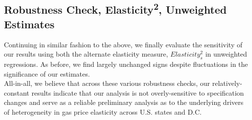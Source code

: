\begin{table}[H]
	\begin{center}
		
		\label{pop_share_estimates_y2_w}
		\caption[Alternate Cheaper Gas Border Predictor Estimates, Weighted]{Continuing as described in table \ref{main_estimates_y2_w}, we find largely similar results using our alternate elasticity measure.}
	\end{center}
\end{table}

\subsection{Robustness Check, Elasticity\textsuperscript{2}, Unweighted Estimates}
Continuing in similar fashion to the above, we finally evaluate the sensitivity of our results using both the alternate elasticity measure, $Elasticity^{2}_{s}$ in unweighted regressions. As before, we find largely unchanged signs despite fluctuations in the significance of our estimates. \\

All-in-all, we believe that across these various robustness checks, our relatively-constant results indicate that our analysis is not overly-sensitive to specification changes and serve as a reliable preliminary analysis as to the underlying drivers of heterogeneity in gas price elasticity across U.S. states and D.C. 

\begin{table}[H]
	\begin{center}
		
		\label{main_estimates_y2}
		\caption[Alternate Main Predictor Estimates, Unweighted]{Turning to unweighted estimates using our secondary elasticity outcome, we once again find largely similar results, indicating that our weighting decision is not altering our results unduly.}
	\end{center}
\end{table}

\begin{table}[H]
	\begin{center}
		
		\label{environmental_estimates_y2}
		\caption[Alternate Environmental Predictor Estimates, Unweighted]{Continuing as described in table \ref{main_estimates_y2}, we find largely similar results in unweighted regressions using our alternate elasticity measure.}
	\end{center}
\end{table}

